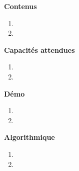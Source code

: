 \documentclass[10pt,a4paper]{article}
\begin{document}
\textbf{Contenus}

\begin{enumerate} 
\item 
\item 
\end{enumerate}


\textbf{Capacités attendues}

\begin{enumerate}
\item 
\item 
\end{enumerate}

\textbf{Démo}

\begin{enumerate}
\item 
\item 
\end{enumerate}

\textbf{Algorithmique}

\begin{enumerate}
\item 
\item 
\end{enumerate}
\end{document}
